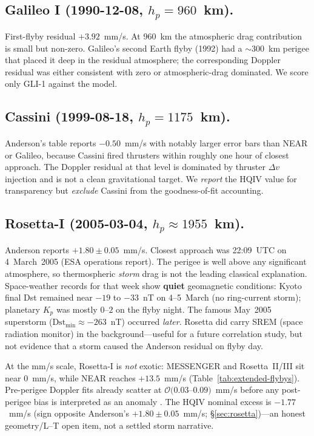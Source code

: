\documentclass[11pt]{amsart}
\begin{document}
\subsection*{Galileo I (1990-12-08, $h_p=960$~km).}
First-flyby residual $+3.92$~mm/s. At 960~km the atmospheric drag contribution is small but
non-zero. Galileo's second Earth flyby (1992) had a $\sim$300~km perigee that placed it deep
in the residual atmosphere; the corresponding Doppler residual was either consistent with
zero or atmospheric-drag dominated. We score only GLI-1 against the model.

\subsection*{Cassini (1999-08-18, $h_p=1175$~km).}
Anderson's table reports $-0.50$~mm/s with notably larger error bars than NEAR or Galileo,
because Cassini fired thrusters within roughly one hour of closest approach. The Doppler
residual at that level is dominated by thruster $\Delta v$ injection and is not a clean
gravitational target. We \emph{report} the HQIV value for transparency but \emph{exclude}
Cassini from the goodness-of-fit accounting.

\subsection*{Rosetta-I (2005-03-04, $h_p\approx 1955$~km).}
Anderson reports $+1.80\pm 0.05$~mm/s. Closest approach was
22:09~UTC on 4~March~2005 (ESA operations report). The perigee is well above any significant
atmosphere, so thermospheric \emph{storm} drag is not the leading classical explanation.
Space-weather records for that week show \textbf{quiet} geomagnetic conditions:
Kyoto final Dst remained near $-19$ to $-33$~nT on 4--5~March (no ring-current storm);
planetary $K_p$ was mostly $0$--$2$ on the flyby night. The famous May~2005 superstorm
($\mathrm{Dst}_{\min}\approx -263$~nT) occurred \emph{later}. Rosetta did carry SREM
(space radiation monitor) in the background---useful for a future correlation study, but
not evidence that a storm caused the Anderson residual on flyby day.

At the mm/s scale, Rosetta-I is \emph{not} exotic: MESSENGER and Rosetta~II/III sit near
$0$~mm/s, while NEAR reaches $+13.5$~mm/s (Table~\ref{tab:extended-flybys}). Pre-perigee
Doppler fits already scatter at $\mathcal{O}(0.03$--$0.09)$~mm/s before any post-perigee
bias is interpreted as an anomaly \cite{anderson2008}. The HQIV nominal excess is
$-1.77$~mm/s (sign opposite Anderson's $+1.80\pm0.05$~mm/s; \S\ref{sec:rosetta})---an
honest geometry/L--T open item, not a settled storm narrative.
\end{document}
